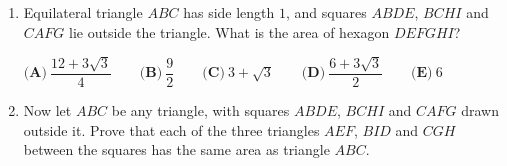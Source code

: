 \begin{enumerate}
\item[(a)] Equilateral triangle $ABC$ has side length $1$, and squares $ABDE$, $BCHI$ and $CAFG$ lie outside the triangle. What is the area of hexagon $DEFGHI$?

$\textbf{(A)}\ \dfrac{12+3\sqrt3}{4}\qquad\textbf{(B)}\ \dfrac{9}{2}\qquad\textbf{(C)}\ 3+\sqrt3\qquad\textbf{(D)}\ \dfrac{6+3\sqrt3}{2}\qquad\textbf{(E)}\ 6$
\item[(b)] Now let $ABC$ be any triangle, with squares $ABDE$, $BCHI$ and $CAFG$ drawn outside it. Prove that each of the three triangles $AEF$, $BID$ and $CGH$ between the squares has the same area as triangle $ABC$.
\end{enumerate}
